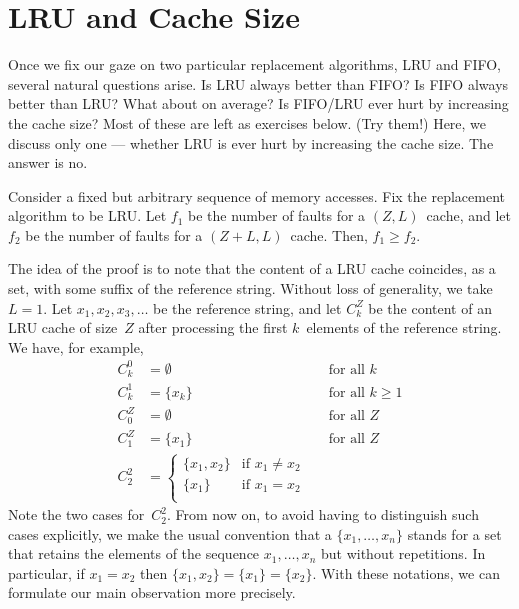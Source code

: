 \section*{LRU and Cache Size}

Once we fix our gaze on two particular replacement algorithms,
  LRU and FIFO,
  several natural questions arise.
Is LRU always better than FIFO?
Is FIFO always better than LRU?
What about on average?
Is FIFO/LRU ever hurt by increasing the cache size?
Most of these are left as exercises below.
(Try them!)
Here, we discuss only one ---
  whether LRU is ever hurt by increasing the cache size.
The answer is no.

\begin{theorem}\label{thm:lru-monotone}
Consider a fixed but arbitrary sequence of memory accesses.
Fix the replacement algorithm to be LRU\null.
Let $f_1$ be the number of faults for a $(Z,L)$~cache,
  and let $f_2$ be the number of faults for a $(Z+L,L)$~cache.
Then, $f_1 \ge f_2$.
\end{theorem}

The idea of the proof is to note that the content of a LRU cache
  coincides, as a set, with some suffix of the reference string.
Without loss of generality, we take $L=1$.
Let $x_1,x_2,x_3,\ldots$ be the reference string,
  and let $C^Z_k$ be the content of an LRU cache of size~$Z$
    after processing the first $k$~elements of the reference string.
We have, for example,
\begin{align}
  C^0_k &= \emptyset
    &&\text{for all $k$}
\\
  C^1_k &= \{x_k\}
    &&\text{for all $k \ge 1$}
\\
  C^Z_0 &= \emptyset
    &&\text{for all $Z$}
\\
  C^Z_1 &= \{x_1\}
    &&\text{for all $Z$}
\\
  C^2_2 &=
  \begin{cases}
  \{x_1,x_2\} & \text{if $x_1 \ne x_2$} \\
  \{x_1\} & \text{if $x_1 = x_2$} \\
  \end{cases}
\end{align}
Note the two cases for~$C^2_2$.
From now on, to avoid having to distinguish such cases explicitly,
  we make the usual convention that a $\{x_1,\ldots,x_n\}$
  stands for a set that retains the elements of the sequence $x_1,\ldots,x_n$
    but without repetitions.
In particular, if $x_1=x_2$ then $\{x_1,x_2\}=\{x_1\}=\{x_2\}$.
With these notations,
  we can formulate our main observation more precisely.

